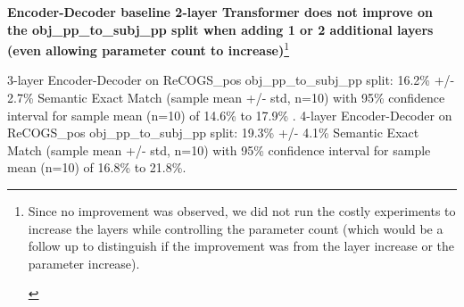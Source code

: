 \documentclass[11pt]{article}
\begin{document}


\textbf{\cite{Wu2023} Encoder-Decoder baseline 2-layer Transformer does not improve on the obj\_pp\_to\_subj\_pp split when adding 1 or 2 additional layers}
\label{wu-baseline-layer-variation-experiment-results}
\textbf{(even allowing parameter count to increase)}\footnote{\begin{footnotesize}
Since no improvement was observed, we did not run the costly experiments to increase the layers while controlling the parameter count (which would be a follow up to distinguish if the improvement was from the layer increase or the parameter increase).
\end{footnotesize}
}

3-layer \cite{Wu2023} Encoder-Decoder on ReCOGS\_pos obj\_pp\_to\_subj\_pp split: 16.2\% +/- 2.7\% Semantic Exact Match (sample mean +/- std, n=10) with 95\% confidence interval for sample mean (n=10) of 14.6\% to 17.9\% . 4-layer \cite{Wu2023} Encoder-Decoder on ReCOGS\_pos obj\_pp\_to\_subj\_pp split: 19.3\% +/- 4.1\% Semantic Exact Match (sample mean +/- std, n=10) with 95\% confidence interval for sample mean (n=10) of 16.8\% to 21.8\%.
\end{document}
